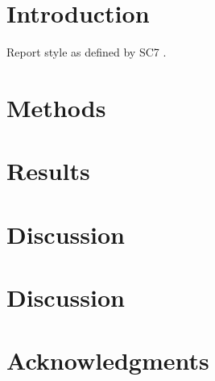 \section{Introduction}

Report style as defined by SC7 \citep{SC7}.

\section{Methods}

\section{Results}

\section{Discussion}

\section{Discussion}

\section{Acknowledgments}

